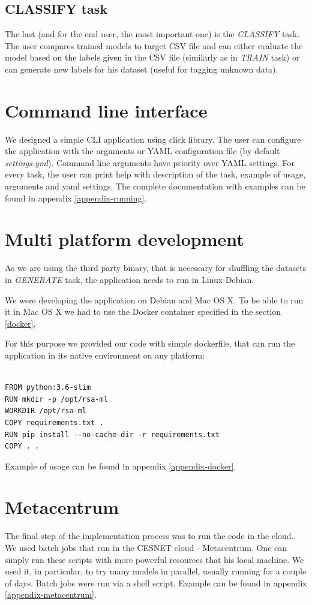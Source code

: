 \subsection{CLASSIFY task}

The last (and for the end user, the most important one) is the \textit{CLASSIFY} task. The user compares trained models to target CSV file and can either evaluate the model based on the labels given in the CSV file (similarly as in \textit{TRAIN} task) or can generate new labels for his dataset (useful for tagging unknown data).

\section{Command line interface}
\label{cli}

We designed a simple CLI application using click library. The user can configure the application with the arguments or YAML configuration file (by default \textit{settings.yml}). Command line arguments have priority over YAML settings. For every task, the user can print help with description of the task, example of usage, arguments and yaml settings. The complete documentation with examples can be found in appendix \ref{appendix-running}.

\section{Multi platform development}

As we are using the third party binary, that is necessary for shuffling the datasets in \textit{GENERATE} task, the application needs to run in Linux Debian.

We were developing the application on Debian and Mac OS X. To be able to run it in Mac OS X we had to use the Docker container specified in the section \ref{docker}.

For this purpose we provided our code with simple dockerfile, that can run the application in its native environment on any platform:

\begin{verbatim}

FROM python:3.6-slim
RUN mkdir -p /opt/rsa-ml
WORKDIR /opt/rsa-ml
COPY requirements.txt .
RUN pip install --no-cache-dir -r requirements.txt
COPY . .

\end{verbatim}

\noindent
Example of usage can be found in appendix \ref{appendix-docker}.

\section{Metacentrum}

The final step of the implementation process was to run the code in the cloud. We used batch jobs\cite{metacentrum} that run in the CESNET cloud - Metacentrum. One can simply run these scripts with more powerful resources that his local machine. We used it, in particular, to try many models in parallel, usually running for a couple of days. Batch jobs were run via a shell script. Example can be found in appendix \ref{appendix-metacentrum}.
